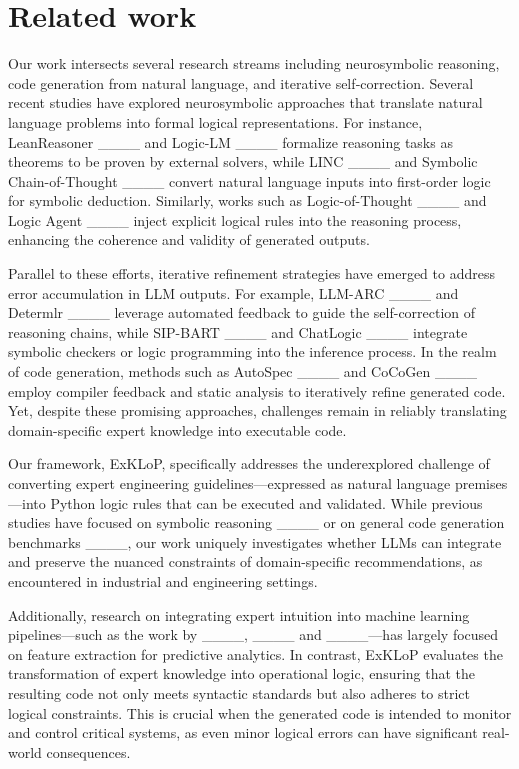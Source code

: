 \section{Related work}
Our work intersects several research streams including neurosymbolic reasoning, code generation from natural language, and iterative self‐correction. Several recent studies have explored neurosymbolic approaches that translate natural language problems into formal logical representations. For instance, LeanReasoner ____ and Logic-LM ____ formalize reasoning tasks as theorems to be proven by external solvers, while LINC ____ and Symbolic Chain-of-Thought ____ convert natural language inputs into first-order logic for symbolic deduction. Similarly, works such as Logic-of-Thought ____ and Logic Agent ____ inject explicit logical rules into the reasoning process, enhancing the coherence and validity of generated outputs.

Parallel to these efforts, iterative refinement strategies have emerged to address error accumulation in LLM outputs. For example, LLM-ARC ____ and Determlr ____ leverage automated feedback to guide the self-correction of reasoning chains, while SIP-BART ____ and ChatLogic ____ integrate symbolic checkers or logic programming into the inference process. In the realm of code generation, methods such as AutoSpec ____ and CoCoGen ____ employ compiler feedback and static analysis to iteratively refine generated code. Yet, despite these promising approaches, challenges remain in reliably translating domain-specific expert knowledge into executable code.

Our framework, ExKLoP, specifically addresses the underexplored challenge of converting expert engineering guidelines—expressed as natural language premises—into Python logic rules that can be executed and validated. While previous studies have focused on symbolic reasoning ____ or on general code generation benchmarks ____, our work uniquely investigates whether LLMs can integrate and preserve the nuanced constraints of domain-specific recommendations, as encountered in industrial and engineering settings.

Additionally, research on integrating expert intuition into machine learning pipelines—such as the work by ____, ____ and ____—has largely focused on feature extraction for predictive analytics. In contrast, ExKLoP evaluates the transformation of expert knowledge into operational logic, ensuring that the resulting code not only meets syntactic standards but also adheres to strict logical constraints. This is crucial when the generated code is intended to monitor and control critical systems, as even minor logical errors can have significant real-world consequences.

